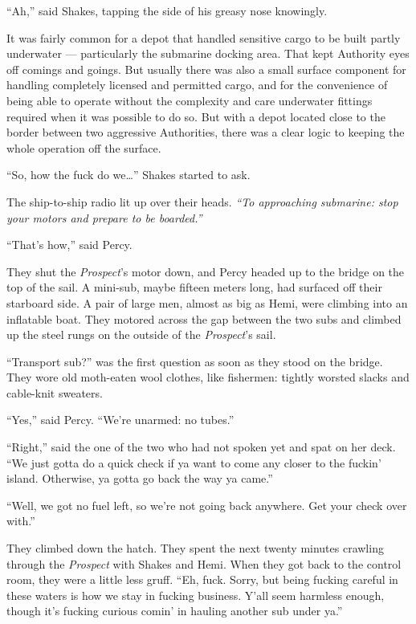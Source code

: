 \documentclass[
]{scrbook}
\begin{document}
``Ah,'' said Shakes, tapping the side of his greasy nose knowingly.

It was fairly common for a depot that handled sensitive cargo to be
built partly underwater --- particularly the submarine docking area.
That kept Authority eyes off comings and goings. But usually there was
also a small surface component for handling completely licensed and
permitted cargo, and for the convenience of being able to operate
without the complexity and care underwater fittings required when it was
possible to do so. But with a depot located close to the border between
two aggressive Authorities, there was a clear logic to keeping the whole
operation off the surface.

``So, how the fuck do we\ldots{}'' Shakes started to ask.

The ship-to-ship radio lit up over their heads. \emph{``To approaching
submarine: stop your motors and prepare to be boarded.''}

``That's how,'' said Percy.

They shut the \emph{Prospect}'s motor down, and Percy headed up to the
bridge on the top of the sail. A mini-sub, maybe fifteen meters long,
had surfaced off their starboard side. A pair of large men, almost as
big as Hemi, were climbing into an inflatable boat. They motored across
the gap between the two subs and climbed up the steel rungs on the
outside of the \emph{Prospect}'s sail.

``Transport sub?'' was the first question as soon as they stood on the
bridge. They wore old moth-eaten wool clothes, like fishermen: tightly
worsted slacks and cable-knit sweaters.

``Yes,'' said Percy. ``We're unarmed: no tubes.''

``Right,'' said the one of the two who had not spoken yet and spat on
her deck. ``We just gotta do a quick check if ya want to come any closer
to the fuckin' island. Otherwise, ya gotta go back the way ya came.''

``Well, we got no fuel left, so we're not going back anywhere. Get your
check over with.''

They climbed down the hatch. They spent the next twenty minutes crawling
through the \emph{Prospect} with Shakes and Hemi. When they got back to
the control room, they were a little less gruff. ``Eh, fuck. Sorry, but
being fucking careful in these waters is how we stay in fucking
business. Y'all seem harmless enough, though it's fucking curious comin'
in hauling another sub under ya.''
\end{document}
